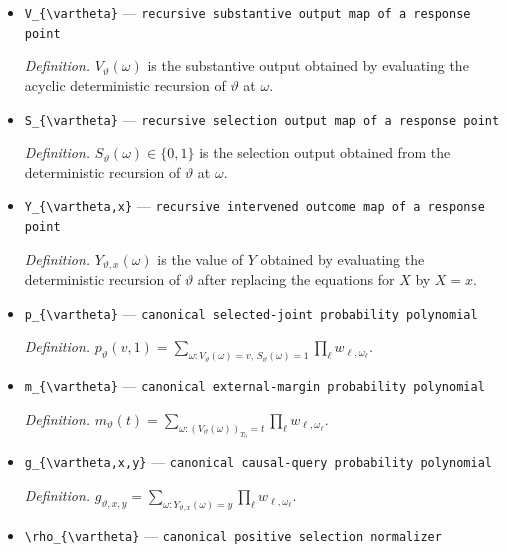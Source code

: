 \documentclass{article}
\begin{document}
\begin{itemize}
  \item \texttt{V\_\allowbreak{}\{\textbackslash{}\allowbreak{}vartheta\}\allowbreak{}} --- \texttt{recursive substantive output map of a response point}
  \par\smallskip\noindent\emph{Definition.} \(V_{\vartheta}(\omega)\) is the substantive output obtained by evaluating the acyclic deterministic recursion of \(\vartheta\) at \(\omega\).
  \item \texttt{S\_\allowbreak{}\{\textbackslash{}\allowbreak{}vartheta\}\allowbreak{}} --- \texttt{recursive selection output map of a response point}
  \par\smallskip\noindent\emph{Definition.} \(S_{\vartheta}(\omega)\in\{0,1\}\) is the selection output obtained from the deterministic recursion of \(\vartheta\) at \(\omega\).
  \item \texttt{Y\_\allowbreak{}\{\textbackslash{}\allowbreak{}vartheta,\allowbreak{}x\}\allowbreak{}} --- \texttt{recursive intervened outcome map of a response point}
  \par\smallskip\noindent\emph{Definition.} \(Y_{\vartheta,x}(\omega)\) is the value of \(Y\) obtained by evaluating the deterministic recursion of \(\vartheta\) after replacing the equations for \(X\) by \(X=x\).
  \item \texttt{p\_\allowbreak{}\{\textbackslash{}\allowbreak{}vartheta\}\allowbreak{}} --- \texttt{canonical selected-\allowbreak{}joint probability polynomial}
  \par\smallskip\noindent\emph{Definition.} \(p_{\vartheta}(v,1)=\sum_{\omega:V_{\vartheta}(\omega)=v,\,S_{\vartheta}(\omega)=1}\prod_{\ell}w_{\ell,\omega_{\ell}}\).
  \item \texttt{m\_\allowbreak{}\{\textbackslash{}\allowbreak{}vartheta\}\allowbreak{}} --- \texttt{canonical external-\allowbreak{}margin probability polynomial}
  \par\smallskip\noindent\emph{Definition.} \(m_{\vartheta}(t)=\sum_{\omega:(V_{\vartheta}(\omega))_{T_0}=t}\prod_{\ell}w_{\ell,\omega_{\ell}}\).
  \item \texttt{g\_\allowbreak{}\{\textbackslash{}\allowbreak{}vartheta,\allowbreak{}x,\allowbreak{}y\}\allowbreak{}} --- \texttt{canonical causal-\allowbreak{}query probability polynomial}
  \par\smallskip\noindent\emph{Definition.} \(g_{\vartheta,x,y}=\sum_{\omega:Y_{\vartheta,x}(\omega)=y}\prod_{\ell}w_{\ell,\omega_{\ell}}\).
  \item \texttt{\textbackslash{}\allowbreak{}rho\_\allowbreak{}\{\textbackslash{}\allowbreak{}vartheta\}\allowbreak{}} --- \texttt{canonical positive selection normalizer}

\end{itemize}
\end{document}
